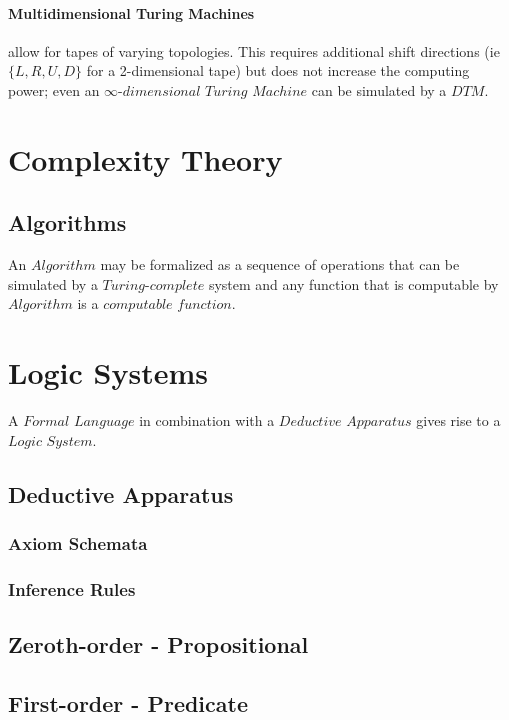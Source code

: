 \documentclass{article}
\begin{document}
    \paragraph{Multidimensional Turing Machines} allow for tapes of
    varying topologies. This requires additional shift directions (ie
    $\{L, R, U, D\}$ for a 2-dimensional tape) but does not increase
    the computing power; even an $\infty$-$dimensional$ $Turing$
    $Machine$ can be simulated by a $DTM$.

\section{Complexity Theory}

\subsection{Algorithms}
    An $Algorithm$ may be formalized as a sequence of operations that
    can be simulated by a $Turing$-$complete$ system and any function
    that is computable by $Algorithm$ is a $computable$ $function$.

\section{Logic Systems}

A $Formal$ $Language$ in combination with a $Deductive$ $Apparatus$
gives rise to a $Logic$ $System$.

\subsection{Deductive Apparatus}

\subsubsection{Axiom Schemata}

\subsubsection{Inference Rules}

\subsection{Zeroth-order - Propositional}

\subsection{First-order - Predicate}
\end{document}
